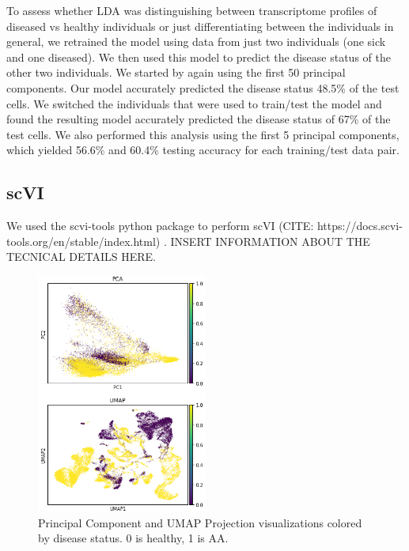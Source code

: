 \documentclass{article}
\begin{document}
To assess whether LDA was distinguishing between transcriptome profiles of diseased vs healthy individuals or just differentiating between the individuals in general, we retrained the model using data from just two individuals (one sick and one diseased).
We then used this model to predict the disease status of the other two individuals.
We started by again using the first 50 principal components.
Our model accurately predicted the disease status 48.5\% of the test cells.
We switched the individuals that were used to train/test the model and found the resulting model accurately predicted the disease status of 67\% of the test cells.
We also performed this analysis using the first 5 principal components, which yielded 56.6\% and 60.4\% testing accuracy for each training/test data pair.

\subsection{scVI}
We used the scvi-tools python package to perform scVI (CITE: https://docs.scvi-tools.org/en/stable/index.html) \citep{lopez_deep_2018}.
INSERT INFORMATION ABOUT THE TECNICAL DETAILS HERE.


\begin{figure}
  \centering
  \includegraphics[width=0.5\textwidth]{disease_status.png}
  \caption{Principal Component and UMAP Projection visualizations colored by disease status. 0 is healthy, 1 is AA.}
  \label{PCA_projections_disease}
\end{figure}
\end{document}
